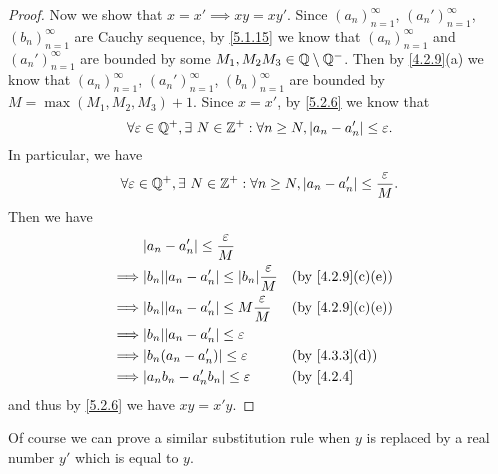 \begin{proof}
  Now we show that \(x = x' \implies xy = xy'\).
  Since \((a_n)_{n = 1}^\infty\), \((a_n')_{n = 1}^\infty\), \((b_n)_{n = 1}^\infty\) are Cauchy sequence, by \cref{5.1.15} we know that \((a_n)_{n = 1}^\infty\) and \((a_n')_{n = 1}^\infty\) are bounded by some \(M_1, M_2 M_3 \in \mathbb{Q} \setminus \mathbb{Q}^-\).
  Then by \cref{4.2.9}(a) we know that \((a_n)_{n = 1}^\infty\), \((a_n')_{n = 1}^\infty\), \((b_n)_{n = 1}^\infty\) are bounded by \(M = \max(M_1, M_2, M_3) + 1\).
  Since \(x = x'\), by \cref{5.2.6} we know that
  \[
    \forall \varepsilon \in \mathbb{Q}^+, \exists\ N \in \mathbb{Z}^+ : \forall n \geq N, \left\lvert a_n - a_n'\right\rvert \leq \varepsilon.
  \]
  In particular, we have
  \[
    \forall \varepsilon \in \mathbb{Q}^+, \exists\ N \in \mathbb{Z}^+ : \forall n \geq N, \left\lvert a_n - a_n'\right\rvert \leq \dfrac{\varepsilon}{M}.
  \]
  Then we have
  \begin{align*}
             & \abs{a_n - a_n'} \leq \dfrac{\varepsilon}{M}                                                         \\
    \implies & \abs{b_n} \abs{a_n - a_n'} \leq \abs{b_n} \dfrac{\varepsilon}{M} &  & \text{(by \cref{4.2.9}(c)(e))} \\
    \implies & \abs{b_n} \abs{a_n - a_n'} \leq M \dfrac{\varepsilon}{M}         &  & \text{(by \cref{4.2.9}(c)(e))} \\
    \implies & \abs{b_n} \abs{a_n - a_n'} \leq \varepsilon                                                          \\
    \implies & \abs{b_n (a_n - a_n')} \leq \varepsilon                          &  & \text{(by \cref{4.3.3}(d))}    \\
    \implies & \abs{a_n b_n - a_n' b_n} \leq \varepsilon                        &  & \text{(by \cref{4.2.4}}
  \end{align*}
  and thus by \cref{5.2.6} we have \(xy = x'y\).
\end{proof}

\begin{note}
  Of course we can prove a similar substitution rule when \(y\) is replaced by a real number \(y'\) which is equal to \(y\).
\end{note}

